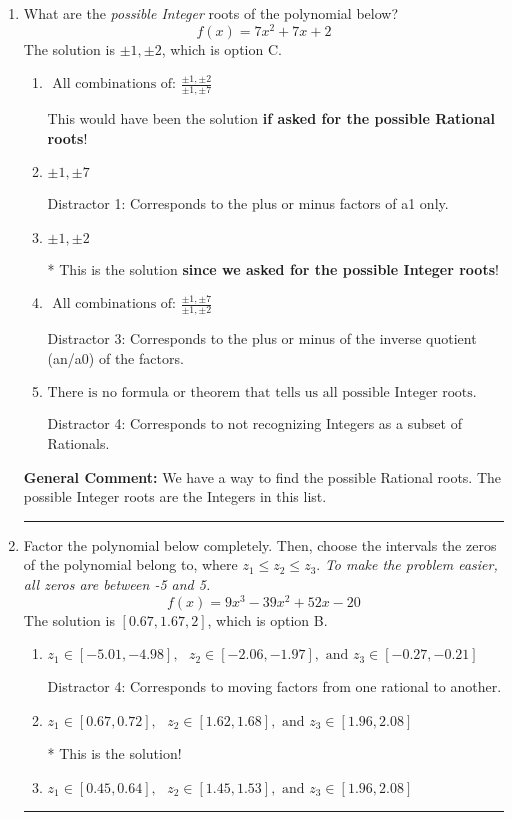 \documentclass{extbook}[14pt]
\newcommand{\litem}[1]{\item #1

\rule{\textwidth}{0.4pt}}
\begin{document}
\begin{enumerate}\litem{
What are the \textit{possible Integer} roots of the polynomial below?
\[ f(x) = 7x^{2} +7 x + 2 \]The solution is \( \pm 1,\pm 2 \), which is option C.\begin{enumerate}[label=\Alph*.]
\item \( \text{ All combinations of: }\frac{\pm 1,\pm 2}{\pm 1,\pm 7} \)

This would have been the solution \textbf{if asked for the possible Rational roots}!
\item \( \pm 1,\pm 7 \)

 Distractor 1: Corresponds to the plus or minus factors of a1 only.
\item \( \pm 1,\pm 2 \)

* This is the solution \textbf{since we asked for the possible Integer roots}!
\item \( \text{ All combinations of: }\frac{\pm 1,\pm 7}{\pm 1,\pm 2} \)

 Distractor 3: Corresponds to the plus or minus of the inverse quotient (an/a0) of the factors. 
\item \( \text{There is no formula or theorem that tells us all possible Integer roots.} \)

 Distractor 4: Corresponds to not recognizing Integers as a subset of Rationals.
\end{enumerate}

\textbf{General Comment:} We have a way to find the possible Rational roots. The possible Integer roots are the Integers in this list.
}
\litem{
Factor the polynomial below completely. Then, choose the intervals the zeros of the polynomial belong to, where $z_1 \leq z_2 \leq z_3$. \textit{To make the problem easier, all zeros are between -5 and 5.}
\[ f(x) = 9x^{3} -39 x^{2} +52 x -20 \]The solution is \( [0.67, 1.67, 2] \), which is option B.\begin{enumerate}[label=\Alph*.]
\item \( z_1 \in [-5.01, -4.98], \text{   }  z_2 \in [-2.06, -1.97], \text{   and   } z_3 \in [-0.27, -0.21] \)

 Distractor 4: Corresponds to moving factors from one rational to another.
\item \( z_1 \in [0.67, 0.72], \text{   }  z_2 \in [1.62, 1.68], \text{   and   } z_3 \in [1.96, 2.08] \)

* This is the solution!
\item \( z_1 \in [0.45, 0.64], \text{   }  z_2 \in [1.45, 1.53], \text{   and   } z_3 \in [1.96, 2.08] \)


\end{enumerate}}
\end{enumerate}
\end{document}
